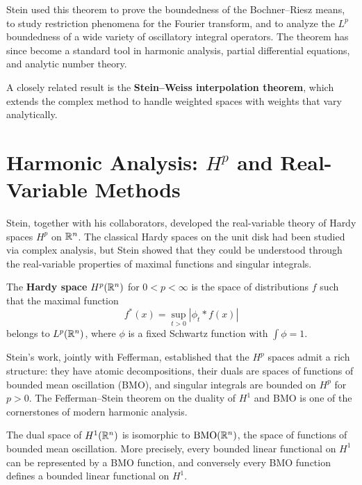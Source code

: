 Stein used this theorem to prove the boundedness of the Bochner--Riesz means, to study restriction phenomena for the Fourier transform, and to analyze the \(L^p\) boundedness of a wide variety of oscillatory integral operators. The theorem has since become a standard tool in harmonic analysis, partial differential equations, and analytic number theory.

A closely related result is the \textbf{Stein--Weiss interpolation theorem}, which extends the complex method to handle weighted spaces with weights that vary analytically.

\section{Harmonic Analysis: \texorpdfstring{\(H^p\)}{Hp Spaces} and Real-Variable Methods}

Stein, together with his collaborators, developed the real-variable theory of Hardy spaces \(H^p\) on \(\mathbb{R}^n\). The classical Hardy spaces on the unit disk had been studied via complex analysis, but Stein showed that they could be understood through the real-variable properties of maximal functions and singular integrals.

\begin{definition}
The \textbf{Hardy space} \(H^p(\mathbb{R}^n)\) for \(0 < p < \infty\) is the space of distributions \(f\) such that the maximal function
\[
f^*(x) = \sup_{t>0} |\phi_t * f(x)|
\]
belongs to \(L^p(\mathbb{R}^n)\), where \(\phi\) is a fixed Schwartz function with \(\int \phi = 1\).
\end{definition}

Stein's work, jointly with Fefferman, established that the \(H^p\) spaces admit a rich structure: they have atomic decompositions, their duals are spaces of functions of bounded mean oscillation (BMO), and singular integrals are bounded on \(H^p\) for \(p > 0\). The Fefferman--Stein theorem on the duality of \(H^1\) and BMO is one of the cornerstones of modern harmonic analysis.

\begin{theorem}
The dual space of \(H^1(\mathbb{R}^n)\) is isomorphic to \(\operatorname{BMO}(\mathbb{R}^n)\), the space of functions of bounded mean oscillation. More precisely, every bounded linear functional on \(H^1\) can be represented by a BMO function, and conversely every BMO function defines a bounded linear functional on \(H^1\).
\end{theorem}

